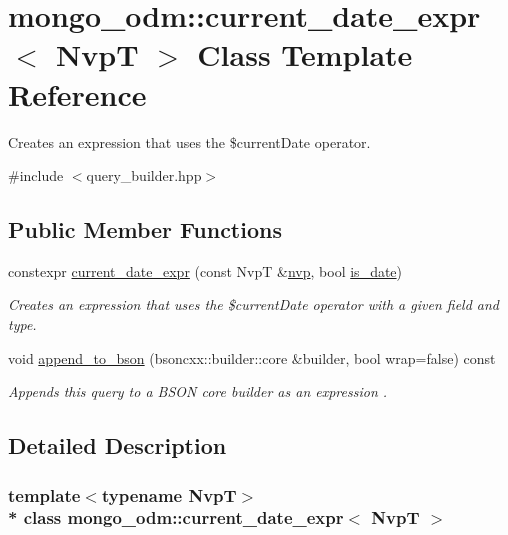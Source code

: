 \hypertarget{classmongo__odm_1_1current__date__expr}{}\section{mongo\+\_\+odm\+:\+:current\+\_\+date\+\_\+expr$<$ NvpT $>$ Class Template Reference}
\label{classmongo__odm_1_1current__date__expr}


Creates an expression that uses the \$current\+Date operator.  




{\ttfamily \#include $<$query\+\_\+builder.\+hpp$>$}

\subsection*{Public Member Functions}
\begin{DoxyCompactItemize}
\item 
constexpr \hyperlink{classmongo__odm_1_1current__date__expr_a1d4c6659a44bc917bbf908a2011ff3d4}{current\+\_\+date\+\_\+expr} (const NvpT \&\hyperlink{classmongo__odm_1_1nvp}{nvp}, bool \hyperlink{structmongo__odm_1_1is__date}{is\+\_\+date})
\begin{DoxyCompactList}\small\item\em Creates an expression that uses the \$current\+Date operator with a given field and type. \end{DoxyCompactList}\item 
void \hyperlink{classmongo__odm_1_1current__date__expr_aa53602f8d005cd22150b0482c4f2070d}{append\+\_\+to\+\_\+bson} (bsoncxx\+::builder\+::core \&builder, bool wrap=false) const 
\begin{DoxyCompactList}\small\item\em Appends this query to a B\+S\+ON core builder as an expression \textquotesingle{}. \end{DoxyCompactList}\end{DoxyCompactItemize}


\subsection{Detailed Description}
\subsubsection*{template$<$typename NvpT$>$\\*
class mongo\+\_\+odm\+::current\+\_\+date\+\_\+expr$<$ Nvp\+T $>$}

